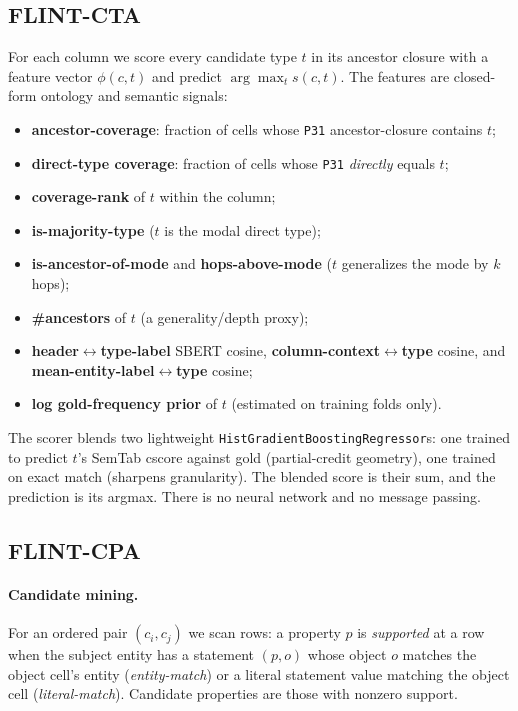 \documentclass[11pt]{article}
\begin{document}
\subsection{FLINT-CTA}
\label{sec:flint-cta}
For each column we score every candidate type $t$ in its ancestor closure with a
feature vector $\phi(c,t)$ and predict $\arg\max_t s(c,t)$. The features are
closed-form ontology and semantic signals:
\begin{itemize}\itemsep1pt
  \item \textbf{ancestor-coverage}: fraction of cells whose \texttt{P31}
        ancestor-closure contains $t$;
  \item \textbf{direct-type coverage}: fraction of cells whose \texttt{P31}
        \emph{directly} equals $t$;
  \item \textbf{coverage-rank} of $t$ within the column;
  \item \textbf{is-majority-type} ($t$ is the modal direct type);
  \item \textbf{is-ancestor-of-mode} and \textbf{hops-above-mode} ($t$ generalizes
        the mode by $k$ hops);
  \item \textbf{\#ancestors} of $t$ (a generality/depth proxy);
  \item \textbf{header$\leftrightarrow$type-label} SBERT \cite{sbert} cosine,
        \textbf{column-context$\leftrightarrow$type} cosine, and
        \textbf{mean-entity-label$\leftrightarrow$type} cosine;
  \item \textbf{log gold-frequency prior} of $t$ (estimated on training folds only).
\end{itemize}
The scorer blends two lightweight \texttt{HistGradientBoostingRegressor}s: one
trained to predict $t$'s SemTab cscore against gold (partial-credit geometry), one
trained on exact match (sharpens granularity). The blended score is their sum, and
the prediction is its argmax. There is no neural network and no message passing.

\subsection{FLINT-CPA}
\label{sec:flint-cpa}
\paragraph{Candidate mining.} For an ordered pair $(c_i,c_j)$ we scan rows: a
property $p$ is \emph{supported} at a row when the subject entity has a statement
$(p,o)$ whose object $o$ matches the object cell's entity (\emph{entity-match}) or a
literal statement value matching the object cell (\emph{literal-match}). Candidate
properties are those with nonzero support.
\end{document}
